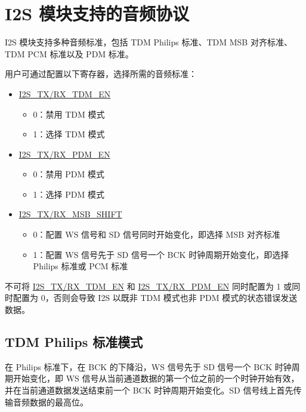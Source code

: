 \documentclass[main\_\_CN.tex]{subfiles}
\begin{document}
\section{I2S 模块支持的音频协议} \label{sec:i2s-supported-audio-standards}

\chipname{} I2S 模块支持多种音频标准，包括 TDM Philips 标准、TDM MSB 对齐标准、TDM PCM 标准以及 PDM 标准。

用户可通过配置以下寄存器，选择所需的音频标准：

\begin{itemize}
    \item \hyperref[fielddesc:I2SRXMSBSHIFT]{I2S\_TX/RX\_TDM\_EN}
    \begin{itemize}
        \item 0：禁用 TDM 模式
        \item 1：选择 TDM 模式
    \end{itemize}
    \item \hyperref[fielddesc:I2SRXMSBSHIFT]{I2S\_TX/RX\_PDM\_EN}
    \begin{itemize}
        \item 0：禁用 PDM 模式
        \item 1：选择 PDM 模式
    \end{itemize}    
    \item \hyperref[fielddesc:I2SRXMSBSHIFT]{I2S\_TX/RX\_MSB\_SHIFT}
    \begin{itemize}
        \item 0：配置 WS 信号和 SD 信号同时开始变化，即选择 MSB 对齐标准
        \item 1：配置 WS 信号先于 SD 信号一个 BCK 时钟周期开始变化，即选择 Philips 标准或 PCM 标准
    \end{itemize}
\end{itemize}

\begin{tiplisting}
不可将 \hyperref[fielddesc:I2SRXMSBSHIFT]{I2S\_TX/RX\_TDM\_EN} 和 \hyperref[fielddesc:I2SRXMSBSHIFT]{I2S\_TX/RX\_PDM\_EN} 同时配置为 1 或同时配置为 0，否则会导致 \chipname{} I2S 以既非 TDM 模式也非 PDM 模式的状态错误发送数据。
\end{tiplisting}

\subsection{TDM Philips 标准模式}

在 Philips 标准下，在 BCK 的下降沿，WS 信号先于 SD 信号一个 BCK 时钟周期开始变化，即 WS 信号从当前通道数据的第一个位之前的一个时钟开始有效，并在当前通道数据发送结束前一个 BCK 时钟周期开始变化。SD 信号线上首先传输音频数据的最高位。
\end{document}
